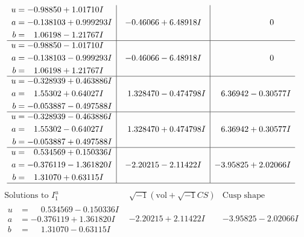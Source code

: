 \documentclass[1p]{elsarticle_modified}
\theoremstyle{definition}
\newcommand{\I}{\sqrt{-1}}
\begin{document}
$$\begin{array}{c|c|c}
\begin{aligned}
u &= -0.98850 + 1.01710 I \\
a &= -0.138103 + 0.999293 I \\
b &= \phantom{-}1.06198 - 1.21767 I\end{aligned}
 & -0.46066 + 6.48918 I & \phantom{-0.000000 } 0 \\ \hline\begin{aligned}
u &= -0.98850 - 1.01710 I \\
a &= -0.138103 - 0.999293 I \\
b &= \phantom{-}1.06198 + 1.21767 I\end{aligned}
 & -0.46066 - 6.48918 I & \phantom{-0.000000 } 0 \\ \hline\begin{aligned}
u &= -0.328939 + 0.463886 I \\
a &= \phantom{-}1.55302 + 0.64027 I \\
b &= -0.053887 - 0.497588 I\end{aligned}
 & \phantom{-}1.328470 - 0.474798 I & \phantom{-}6.36942 - 0.30577 I \\ \hline\begin{aligned}
u &= -0.328939 - 0.463886 I \\
a &= \phantom{-}1.55302 - 0.64027 I \\
b &= -0.053887 + 0.497588 I\end{aligned}
 & \phantom{-}1.328470 + 0.474798 I & \phantom{-}6.36942 + 0.30577 I \\ \hline\begin{aligned}
u &= \phantom{-}0.534569 + 0.150336 I \\
a &= -0.376119 - 1.361820 I \\
b &= \phantom{-}1.31070 + 0.63115 I\end{aligned}
 & -2.20215 - 2.11422 I & -3.95825 + 2.02066 I\\
 \hline 
 \end{array}$$\newpage$$\begin{array}{c|c|c}  
\text{Solutions to }I^u_{1}& \I (\text{vol} + \sqrt{-1}CS) & \text{Cusp shape}\\
 \hline 
\begin{aligned}
u &= \phantom{-}0.534569 - 0.150336 I \\
a &= -0.376119 + 1.361820 I \\
b &= \phantom{-}1.31070 - 0.63115 I\end{aligned}
 & -2.20215 + 2.11422 I & -3.95825 - 2.02066 I \\ \hline\begin{aligned}

\end{aligned}
\end{array}$$
\end{document}
